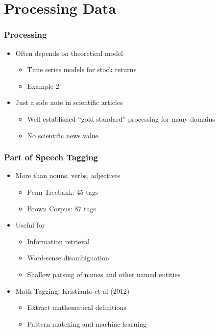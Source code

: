 
 \section{Processing Data}
\begin{frame}
    \frametitle{Processing}
    \begin{itemize}
        \item Often depends on theoretical model
        \begin{itemize}
            \item Time series models for stock returns
            \item Example 2
        \end{itemize}
        \item Just a side note in scientific articles
        \begin{itemize}
            \item Well established ``gold standard'' processing for many domains
            \item No scientific news value
        \end{itemize}
    \end{itemize}
\end{frame}

\begin{frame}
    \frametitle{Part of Speech Tagging}
\begin{itemize}
    \item More than nouns, verbs, adjectives
        \begin{itemize}
        \item Penn Treebank: 45 tags
        \item Brown Corpus: 87 tags
        \end{itemize}
        \end{itemize}
\begin{itemize}
    \item Useful for
        \begin{itemize}
        \item Information retrieval
        \item Word-sense disambiguation
        \item Shallow parsing of names and other named entities
        \end{itemize}
     \end{itemize}
     \begin{itemize}
    \item Math Tagging, \textcolor{iseblue}{Kristianto et al (2012)}
         \begin{itemize}
    \item Extract mathematical definitions
    \item Pattern matching and machine learning
\end{itemize}
\end{itemize}

\end{frame}


